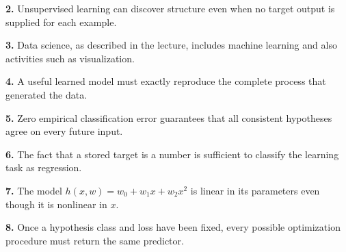 \documentclass[11pt,a4paper]{article}
\begin{document}
\par\noindent\begin{minipage}{\linewidth}
\textbf{2.} Unsupervised learning can discover structure even when no target output is supplied for each example.
\end{minipage}\par\vspace{3mm}
\par\noindent\begin{minipage}{\linewidth}
\textbf{3.} Data science, as described in the lecture, includes machine learning and also activities such as visualization.
\end{minipage}\par\vspace{3mm}
\par\noindent\begin{minipage}{\linewidth}
\textbf{4.} A useful learned model must exactly reproduce the complete process that generated the data.
\end{minipage}\par\vspace{3mm}
\par\noindent\begin{minipage}{\linewidth}
\textbf{5.} Zero empirical classification error guarantees that all consistent hypotheses agree on every future input.
\end{minipage}\par\vspace{3mm}
\par\noindent\begin{minipage}{\linewidth}
\textbf{6.} The fact that a stored target is a number is sufficient to classify the learning task as regression.
\end{minipage}\par\vspace{3mm}
\par\noindent\begin{minipage}{\linewidth}
\textbf{7.} The model \(h(x,w)=w_0+w_1x+w_2x^2\) is linear in its parameters even though it is nonlinear in \(x\).
\end{minipage}\par\vspace{3mm}
\par\noindent\begin{minipage}{\linewidth}
\textbf{8.} Once a hypothesis class and loss have been fixed, every possible optimization procedure must return the same predictor.
\end{minipage}\par\vspace{3mm}
\end{document}
